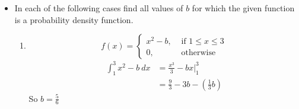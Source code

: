 \documentclass[10pt]{article}
\begin{document}
\begin{itemize}
\begin{enumerate}
\begin{align*}
        We get: $n=20$

      \item After $n$ straight tails, what is the probability that the
        next flip is also tails?

        The probabilities remain the same

    \end{enumerate}

\newpage
  \item[3.2] Suppose the random variable $X$ has possible values
    $\{1,2,3,4,5,6\}$ and probability mass function of the form
    $p(k)=c k$.

    \begin{enumerate}
      \item Find $c$.

        $P(X=1) =c , P(X=2) = 2c, \dots, P(X=6) = 6c$
        So
        \[ P(X=k) = \frac{k}{\sum^{6}_{n=1} n} = \frac{k}{21}   \]

      \item Find the probability that $X$ is odd.
         \begin{align*}
           P(X \in \{1,3,5\}) &= P(X=1) + P(X=3) + P(X=5) \\
                        &= \frac{1}{21} + \frac{3}{21} + \frac{5}{21} \\
                        &= \frac{9}{21}  \\
                        &= \frac{3}{7} 
         \end{align*}
    \end{enumerate}


\newpage
  \item[3.25] In each of the following cases find all values of $b$ for
    which the given function is a probability density function.
    \begin{enumerate}
      \item 
        \[ f(x)=
          \begin{cases}
            x^{2}-b, & \text { if } 1 \leq x \leq 3 \\
            0, & \text { otherwise }
          \end{cases}
        \]
    \begin{align*}
      \int_{1}^{3} {x^2 - b} \: d{x} &= \frac{x^3}{3} -bx \bigg\rvert_1^3 \\
                        &= \frac{9}{3} -3b - (\frac{1}{3} b)
    \end{align*}
    So $b = \frac{5}{6} $


\end{enumerate}
\end{itemize}
\end{document}
